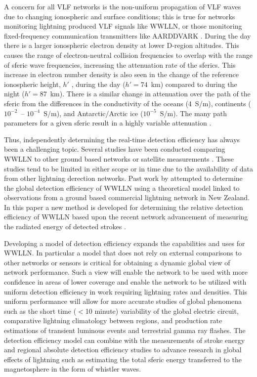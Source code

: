 A concern for all VLF networks is the non-uniform propagation of VLF waves due to changing ionospheric  and surface conditions; this is true for networks monitoring lightning produced VLF signals like WWLLN, or those monitoring fixed-frequency communication transmitters like AARDDVARK \citep{Clilverd2009}.
During the day there is a larger ionospheric electron density at lower D-region altitudes.
This causes the range of electron-neutral collision frequencies to overlap with the range of sferic wave frequencies, increasing the attenuation rate of the sferics.
This increase in electron number density is also seen in the change of the reference ionospheric height, $h'$ \citep{Wait1960a}, during the day ($h'=74$~km) compared to during the night ($h'=87$~km).
There is a similar change in attenuation over the path of the sferic from the differences in the conductivity of the oceans (4~S/m), continents ($10^{-2}$~-- $10^{-4}$~S/m), and Antarctic/Arctic ice ($10^{-5}$~S/m).
The many path parameters for a given sferic result in a highly variable attenuation \citep{Volland1995}.

Thus, independently determining the real-time detection efficiency has always been a challenging topic.
Several studies have been conducted comparing WWLLN to other ground based networks or satellite measurements \citep{Lay2004b, Jacobson2006c, Rodger2009, Abarca2010, Abreu2010}.
These studies tend to be limited in either scope or in time due to the availability of data from other lightning derection networks.
Past work by \citet{Rodger2006} attempted to determine the global detection efficiency of WWLLN using a theoretical model linked to observations from a ground based commercial lightning network in New Zealand.
In this paper a new method is developed for determining the relative detection efficiency of WWLLN based upon the recent network advancement of measuring the radiated energy of detected strokes \citep{Hutchins2012}.

Developing a model of detection efficiency expands the capabilities and uses for WWLLN.
In particular a model that does not rely on external comparisons to other networks or sensors is critical for obtaining a dynamic global view of network performance.
Such a view will enable the network to be used with more confidence in areas of lower coverage and enable the network to be utilized with uniform detection efficiency in work requiring lightning rates and densities.
This uniform performance will allow for more accurate studies of global phenomena such as the short time ($<$10 minute) variability of the global electric circuit, comparative lightning climatology between regions, and production rate estimations of transient luminous events and terrestrial gamma ray flashes.
The detection efficiency model can combine with the measurements of stroke energy and regional absolute detection efficiency studies to advance research in global effects of lightning such as estimating the total sferic energy transferred to the magnetosphere in the form of whistler waves.

